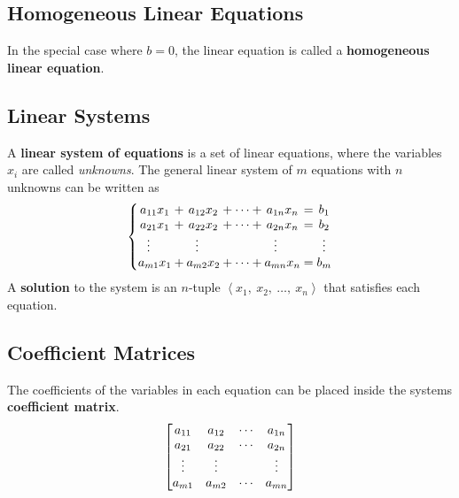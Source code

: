 \documentclass{article}
\begin{document}
	\subsection{Homogeneous Linear Equations}
	\begin{definition}
		In the special case where $b=0$, the linear equation is called a \textbf{homogeneous linear equation}.
	\end{definition}
	\subsection{Linear Systems}
	\begin{definition}
		A \textbf{linear system of equations} is a set of linear equations, where the variables $x_i$ are called \textit{unknowns}. The general linear system of $m$ equations with $n$ unknowns can be written as
		\begin{equation*}
			\left\{
			\setlength\arraycolsep{0pt}
			\begin{array}{ c >{{}}c<{{}} c >{{}}c<{{}} c >{{}}c<{{}} c >{{}}c<{{}} c }
			a_{11}x_1                         &+& a_{12}x_2                         &+& \cdots &+& a_{1n}x_n                         &=& b_1 \\
			a_{21}x_1                         &+& a_{22}x_2                         &+& \cdots &+& a_{2n}x_n                         &=& b_2 \\
			\vdotswithin{a_{31}}\phantom{x_1} & & \vdotswithin{a_{32}}\phantom{x_2} & &        & & \vdotswithin{a_{3n}}\phantom{x_n} & & \vdots \\ 
			a_{m1}x_1                         &+& a_{m2}x_2                         &+& \cdots &+& a_{mn}x_n                         &=& b_m
			\end{array}
			\right.
		\end{equation*}
		A \textbf{solution} to the system is an $n$-tuple $\left\langle x_1,\: x_2,\:\dots,\:x_n\right\rangle$ that satisfies each equation.
	\end{definition}
	\subsection{Coefficient Matrices}
	\begin{definition}
		The coefficients of the variables in each equation can be placed inside the systems \textbf{coefficient matrix}.
		\begin{equation*}
			\mqty[
				a_{11} & a_{12} & \cdots & a_{1n} \\
				a_{21} & a_{22} & \cdots & a_{2n} \\
				\vdots & \vdots &        & \vdots \\
				a_{m1} & a_{m2} & \cdots & a_{mn}
			]
		\end{equation*}
	\end{definition}
\end{document}
